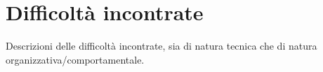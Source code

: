 \section{Difficoltà incontrate}
\label{sez:difficoltà-incontrate}

Descrizioni delle difficoltà incontrate, sia di natura tecnica che di natura organizzativa/comportamentale.\\